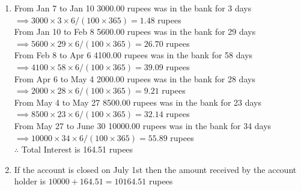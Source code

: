 \documentclass[journal,12pt,twocolumn]{IEEEtran}
\theoremstyle{remark}
\numberwithin{equation}{subsection}
\begin{document}
\begin{enumerate}
\item
From Jan 7 to Jan 10 3000.00 rupees was in the  bank for 3 days $\implies 3000\times3\times6/(100\times365)=1.48$ rupees\\
From Jan 10 to Feb 8 5600.00 rupees was in the  bank for 29 days $\implies 5600\times29\times6/(100\times365)=26.70$ rupees \\
From Feb 8 to Apr 6 4100.00 rupees was in the  bank for 58 days $\implies 4100\times58\times6/(100\times365)=39.09$ rupees\\ 
From Apr 6 to May 4 2000.00 rupees was in the  bank for 28 days $\implies 2000\times28\times6/(100\times365)=9.21$ rupees\\
From May 4 to May 27 8500.00 rupees was in the  bank for 23 days $\implies 8500\times23\times6/(100\times365)=32.14$ rupees\\
From May 27 to June 30 10000.00 rupees was in the  bank for 34 days $\implies 10000\times34\times6/(100\times365)=55.89$ rupees\\
$\therefore$ Total Interest is 164.51 rupees\\
\item If the account is closed on July 1st then the amount received by the account holder is $ 10000 + 164.51 =10164.51$ rupees \\


\end{enumerate}
\end{document}
